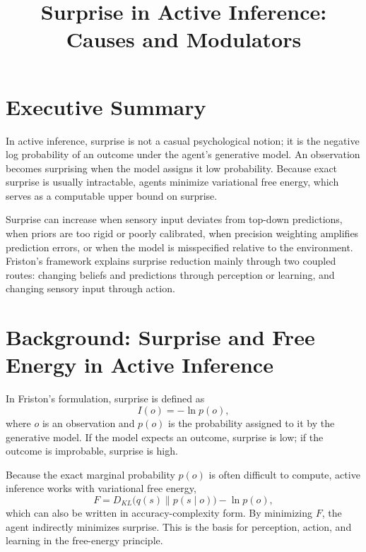 \documentclass[a4paper,11pt]{article}
\title{Surprise in Active Inference: Causes and Modulators}
\author{}
\date{}
\begin{document}
    \maketitle
    
    
    \section{Executive Summary}
        In active inference, surprise is not a casual psychological notion; it is the negative log probability of an outcome under the agent's generative model. An observation becomes surprising when the model assigns it low probability. Because exact surprise is usually intractable, agents minimize variational free energy, which serves as a computable upper bound on surprise.
        
        Surprise can increase when sensory input deviates from top-down predictions, when priors are too rigid or poorly calibrated, when precision weighting amplifies prediction errors, or when the model is misspecified relative to the environment. Friston's framework explains surprise reduction mainly through two coupled routes: changing beliefs and predictions through perception or learning, and changing sensory input through action.
    
    
    \section{Background: Surprise and Free Energy in Active Inference}
        In Friston's formulation, surprise is defined as
        \begin{equation}
            I(o) = -\ln p(o),
        \end{equation}
        where $o$ is an observation and $p(o)$ is the probability assigned to it by the generative model. If the model expects an outcome, surprise is low; if the outcome is improbable, surprise is high.
        
        Because the exact marginal probability $p(o)$ is often difficult to compute, active inference works with variational free energy,
        \begin{equation}
            F = D_{KL}\bigl(q(s) \parallel p(s \mid o)\bigr) - \ln p(o),
        \end{equation}
        which can also be written in accuracy-complexity form. By minimizing $F$, the agent indirectly minimizes surprise. This is the basis for perception, action, and learning in the free-energy principle.
    
\end{document}
